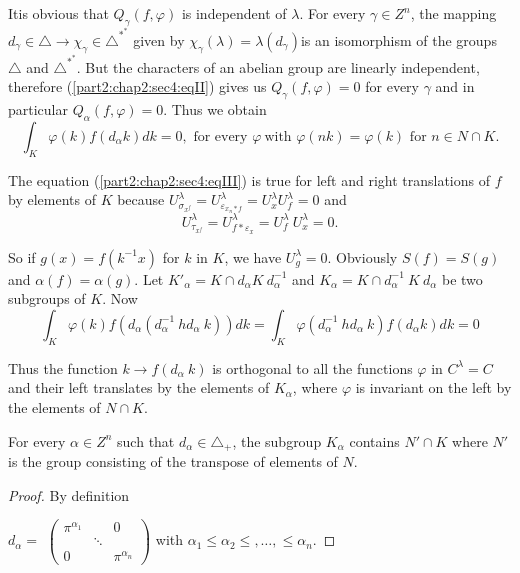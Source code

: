 It\pageoriginale is obvious that $Q_\gamma(f,\varphi)$ is independent of
$\lambda$. For every $\gamma\in Z^n$, the mapping $d_\gamma \in
\triangle\longrightarrow \chi_{\gamma} \in \triangle^{*^{*}}$ given by
$\chi_\gamma(\lambda) = \lambda(d_\gamma)$is an isomorphism of the
groups $\triangle$ and $\triangle^{*^{*}}$. But the characters of an
abelian group are linearly independent, therefore
(\ref{part2:chap2:sec4:eqII}) gives us 
$Q_\gamma(f,\varphi) = 0$ for every $\gamma $ and in particular
$Q_\alpha(f,\varphi) = 0$. Thus we obtain 
\begin{equation}
\int_K\varphi(k)f(d_\alpha k)dk = 0, \text{ for every } \varphi~
\text {with } \varphi(nk) = \varphi(k) \text{ for } n \in N \cap
K. \tag{III}\label{part2:chap2:sec4:eqIII} 
\end{equation}

The equation (\ref{part2:chap2:sec4:eqIII}) is true for left and right
translations of $f$ by 
elements of $K$ because $U^{\lambda}_{\sigma_{x^f}}=
U^{\lambda}_{\varepsilon_{x_n * f}} = U^{\lambda}_x   U^{\lambda}_f = 0
$ and 
$$
U^{\lambda}_{\tau_{x^f}} = U^{\lambda}_{f*\varepsilon_x} =
U^{\lambda}_f~ U^{\lambda}_x = 0. 
$$

So if $g(x)  = f(k^{-1}x)$ for $k$ in $K$, we have $U^{\lambda}_g =
0$. Obviously $S(f) = S(g)$ and $\alpha(f) = \alpha(g)$. Let
$K'_{\alpha} = K \cap d_\alpha K~d^{-1}_\alpha$ and $K_\alpha = K \cap
d^{-1}_{\alpha}~ K~ d_\alpha$ be two subgroups of $K$. Now 
$$
\int_K\varphi(k)f(d_\alpha(d^{-1}_\alpha~hd_\alpha~k))dk = \int_K
\varphi(d^{-1}_\alpha~hd_\alpha ~k) f(d_\alpha k)dk = 0 
$$

Thus the function $k \rightarrow f(d_\alpha~k)$ is orthogonal to all
the functions $\varphi$ in $C^{\lambda} = C$ and their left translates
by the elements of $K_\alpha$, where $\varphi$ is invariant on the
left by the elements of $N \cap K$. 

\begin{lemma*}%
  For every $\alpha \in Z^n$ such that $d_{\alpha}\in \triangle_+$,
  the subgroup $K_\alpha$ contains $N' \cap K$ where $N'$ is the group
  consisting of the transpose of elements of $N$. 
\end{lemma*}

\begin{proof}%
  By definition

  $d_\alpha =$
  $\begin{pmatrix}
    \pi^{\alpha_1} && 0\\
    & \ddots & \\
    0 & & \pi^{\alpha_n}
  \end{pmatrix}$
  with $\alpha_1 \leq \alpha_2 \leq, \ldots,\leq \alpha_n$.
\end{proof}\pageoriginale


